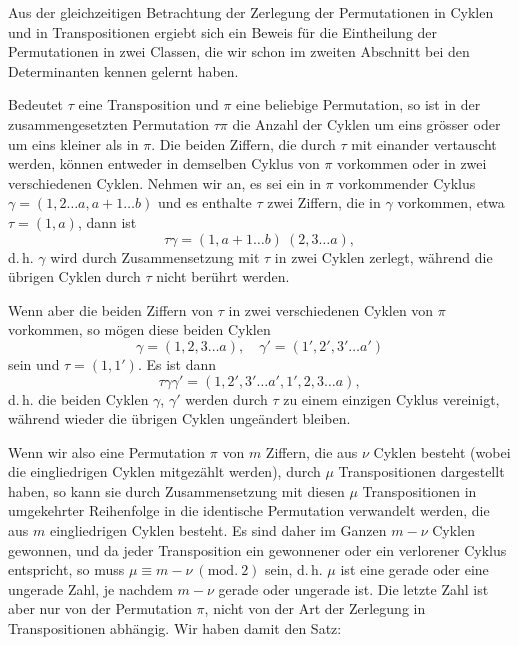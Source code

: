
Aus der gleichzeitigen Betrachtung der Zerlegung der Permutationen in Cyklen und in Transpositionen ergiebt sich ein Beweis für die Eintheilung der Permutationen in zwei Classen, die wir schon im zweiten Abschnitt bei den Determinanten kennen gelernt haben.

Bedeutet $\tau$ eine Transposition und $\pi$ eine beliebige Permutation, so ist in der zusammengesetzten Permutation $\tau\pi$ die Anzahl der Cyklen um eins grösser oder um eins kleiner als in $\pi$. Die beiden Ziffern, die durch $\tau$ mit einander vertauscht werden, können entweder in demselben Cyklus von $\pi$ vorkommen oder in zwei verschiedenen Cyklen. Nehmen wir an, es sei ein in $\pi$ vorkommender Cyklus $\gamma = (1, 2 \dots a, a + 1 \dots b)$ und es enthalte $\tau$ zwei Ziffern, die in $\gamma$ vorkommen, etwa $\tau = (1, a)$, dann ist
\[
\tau\gamma = (1, a + 1 \dots b)\ (2, 3 \dots a),
\]
d.\,h. $\gamma$ wird durch Zusammensetzung mit $\tau$ in zwei Cyklen zerlegt, während die übrigen Cyklen durch $\tau$ nicht berührt werden.

Wenn aber die beiden Ziffern von $\tau$ in zwei verschiedenen Cyklen von $\pi$ vorkommen, so mögen diese beiden Cyklen
\[
\gamma = (1, 2, 3 \dots a), \quad \gamma' = (1', 2', 3' \dots a')
\]
sein und $\tau = (1, 1')$. Es ist dann
\[
\tau\gamma\gamma' = (1, 2', 3' \dots a', 1', 2, 3 \dots a),
\]
d.\,h. die beiden Cyklen $\gamma$, $\gamma'$ werden durch $\tau$ zu einem einzigen Cyklus vereinigt, während wieder die übrigen Cyklen ungeändert bleiben.

Wenn wir also eine Permutation $\pi$ von $m$ Ziffern, die aus $\nu$ Cyklen besteht (wobei die eingliedrigen Cyklen mitgezählt werden), durch $\mu$ Transpositionen dargestellt haben, so kann sie durch Zusammensetzung mit diesen $\mu$ Transpositionen in umgekehrter Reihenfolge in die identische Permutation verwandelt werden, die aus $m$ eingliedrigen Cyklen besteht. Es sind daher im Ganzen $m - \nu$ Cyklen gewonnen, und da jeder Transposition ein gewonnener oder ein verlorener Cyklus entspricht, so muss $\mu \equiv m - \nu\ (\mathrm{mod}.\ 2)$ sein, d.\,h. $\mu$ ist eine gerade oder eine ungerade Zahl, je nachdem $m - \nu$ gerade oder ungerade ist. Die letzte Zahl ist aber nur von der Permutation $\pi$, nicht von der Art der Zerlegung in Transpositionen abhängig. Wir haben damit den Satz:

